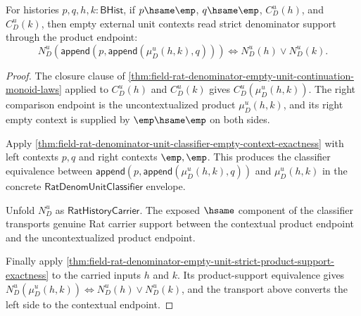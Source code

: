 \begin{theorem}
\label{thm:field-rat-denominator-empty-unit-contextual-strict-product-support-exactness}
For histories $p,q,h,k:\mathsf{BHist}$, if $p\hsame\emp$,
$q\hsame\emp$, $C_D^u(h)$, and $C_D^u(k)$, then empty external unit contexts
read strict denominator support through the product endpoint:
$$
N_D^u(\mathsf{append}(p,\mathsf{append}(\mu_D^u(h,k),q)))
\Longleftrightarrow
N_D^u(h)\lor N_D^u(k).
$$
\end{theorem}
\begin{proof}
The closure clause of
\autoref{thm:field-rat-denominator-empty-unit-continuation-monoid-laws}
applied to $C_D^u(h)$ and $C_D^u(k)$ gives
$C_D^u(\mu_D^u(h,k))$. The right comparison endpoint is the uncontextualized
product $\mu_D^u(h,k)$, and its right empty context is supplied by
$\emp\hsame\emp$ on both sides.

Apply
\autoref{thm:field-rat-denominator-unit-classifier-empty-context-exactness}
with left contexts $p,q$ and right contexts $\emp,\emp$. This produces the
classifier equivalence between
$\mathsf{append}(p,\mathsf{append}(\mu_D^u(h,k),q))$ and
$\mu_D^u(h,k)$ in the concrete
$\mathsf{RatDenomUnitClassifier}$ envelope.

Unfold $N_D^u$ as $\mathsf{RatHistoryCarrier}$. The exposed $\hsame$
component of the classifier transports genuine Rat carrier support between
the contextual product endpoint and the uncontextualized product endpoint.

Finally apply
\autoref{thm:field-rat-denominator-empty-unit-strict-product-support-exactness}
to the carried inputs $h$ and $k$. Its product-support equivalence gives
$N_D^u(\mu_D^u(h,k))\Longleftrightarrow N_D^u(h)\lor N_D^u(k)$, and the
transport above converts the left side to the contextual endpoint.
\end{proof}

